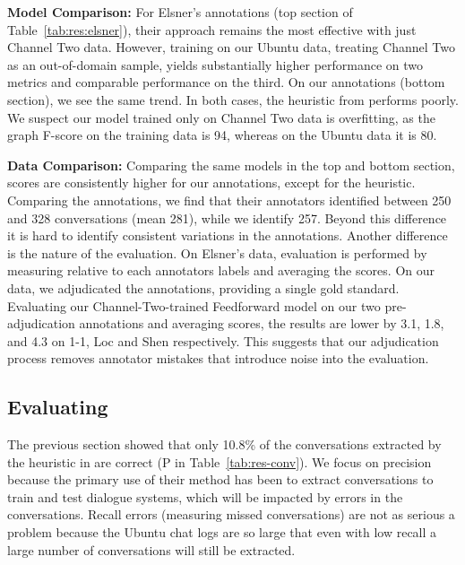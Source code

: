 \documentclass[11pt,a4paper]{article}
\newcommand{\tightparagraph}[1]{\noindent\textbf{#1:}}
\begin{document}
\tightparagraph{Model Comparison}
For Elsner's annotations (top section of Table~\ref{tab:res:elsner}), their approach remains the most effective with just Channel Two data.
However, training on our Ubuntu data, treating Channel Two as an out-of-domain sample, yields substantially higher performance on two metrics and comparable performance on the third.
On our annotations (bottom section), we see the same trend.
In both cases, the heuristic from \citet{Lowe:2015,Lowe:2017:DD} performs poorly.
We suspect our model trained only on Channel Two data is overfitting, as the graph F-score on the training data is 94, whereas on the Ubuntu data it is 80.

\tightparagraph{Data Comparison}
Comparing the same models in the top and bottom section, scores are consistently higher for our annotations, except for the \citet{Lowe:2015,Lowe:2017:DD} heuristic.
Comparing the annotations, we find that their annotators identified between 250 and 328 conversations (mean 281), while we identify 257.
Beyond this difference it is hard to identify consistent variations in the annotations.
Another difference is the nature of the evaluation.
On Elsner's data, evaluation is performed by measuring relative to each annotators labels and averaging the scores.
On our data, we adjudicated the annotations, providing a single gold standard.
Evaluating our Channel-Two-trained Feedforward model on our two pre-adjudication annotations and averaging scores, the results are lower by 3.1, 1.8, and 4.3 on 1-1, Loc and Shen respectively.
This suggests that our adjudication process removes annotator mistakes that introduce noise into the evaluation.

\subsection{Evaluating \citet{Lowe:2015,Lowe:2017:DD}}

The previous section showed that only 10.8\% of the conversations extracted by the heuristic in \citet{Lowe:2015,Lowe:2017:DD} are correct (P in Table~\ref{tab:res-conv}).
We focus on precision because the primary use of their method has been to extract conversations to train and test dialogue systems, which will be impacted by errors in the conversations.
Recall errors (measuring missed conversations) are not as serious a problem because the Ubuntu chat logs are so large that even with low recall a large number of conversations will still be extracted.
\end{document}
